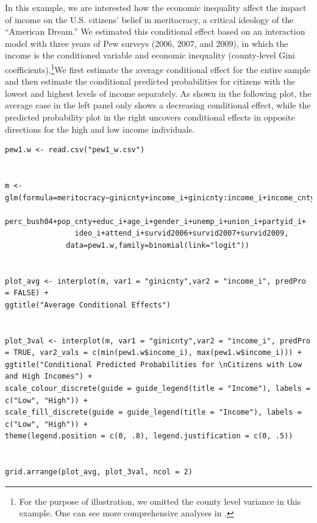 \documentclass[
  article]{jss}
\begin{document}
In this example, we are interested how the economic inequality affect
the impact of income on the U.S. citizens' belief in meritocracy, a
critical ideology of the ``American Dream.'' We estimated this
conditional effect based on an interaction model with three years of Pew
surveys (2006, 2007, and 2009), in which the income is the conditioned
variable and economic inequality (county-level Gini
coefficients).\footnote{For the purpose of illustration, we omitted the
  county level variance in this example. One can see more comprehensive
  analyses in \citep{solt2017}.}We first estimate the average
conditional effect for the entire sample and then estimate the
conditional predicted probabilities for citizens with the lowest and
highest levels of income separately. As shown in the following plot, the
average case in the left panel only shows a decreasing conditional
effect, while the predicted probability plot in the right uncovers
conditional effects in opposite directions for the high and low income
individuals.

\begin{verbatim}
pew1.w <- read.csv("pew1_w.csv")


m <- glm(formula=meritocracy~ginicnty+income_i+ginicnty:income_i+income_cnty+black_cnty+
                perc_bush04+pop_cnty+educ_i+age_i+gender_i+unemp_i+union_i+partyid_i+
                ideo_i+attend_i+survid2006+survid2007+survid2009,
              data=pew1.w,family=binomial(link="logit"))
 
              
plot_avg <- interplot(m, var1 = "ginicnty",var2 = "income_i", predPro = FALSE) + 
ggtitle("Average Conditional Effects")


plot_3val <- interplot(m, var1 = "ginicnty",var2 = "income_i", predPro = TRUE, var2_vals = c(min(pew1.w$income_i), max(pew1.w$income_i))) +
ggtitle("Conditional Predicted Probabilities for \nCitizens with Low and High Incomes") +
scale_colour_discrete(guide = guide_legend(title = "Income"), labels = c("Low", "High")) + 
scale_fill_discrete(guide = guide_legend(title = "Income"), labels = c("Low", "High")) +
theme(legend.position = c(0, .8), legend.justification = c(0, .5))


grid.arrange(plot_avg, plot_3val, ncol = 2)
\end{verbatim}
\end{document}
